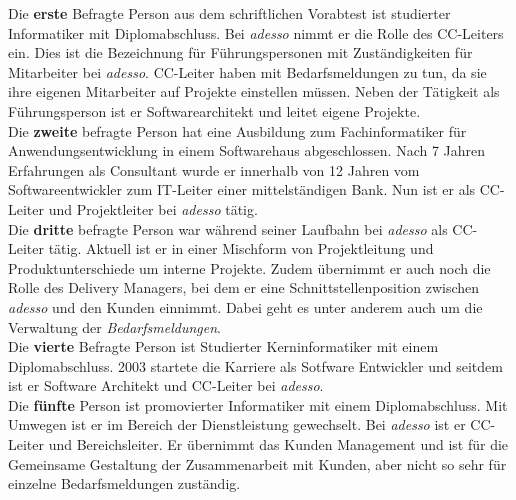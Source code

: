 Die \textbf{erste} Befragte Person aus dem schriftlichen Vorabtest ist studierter Informatiker mit Diplomabschluss. Bei \emph{adesso} nimmt er die Rolle des CC-Leiters ein. Dies ist die Bezeichnung für Führungspersonen mit Zuständigkeiten für Mitarbeiter bei \emph{adesso}. CC-Leiter haben mit Bedarfsmeldungen zu tun, da sie ihre eigenen Mitarbeiter auf Projekte einstellen müssen. Neben der Tätigkeit als Führungsperson ist er Softwarearchitekt und leitet eigene Projekte.\\
Die \textbf{zweite} befragte Person hat eine Ausbildung zum Fachinformatiker für Anwendungsentwicklung in einem Softwarehaus abgeschlossen. Nach 7 Jahren Erfahrungen als Consultant wurde er innerhalb von 12 Jahren vom Softwareentwickler zum IT-Leiter einer mittelständigen Bank. Nun ist er als CC-Leiter und Projektleiter bei \emph{adesso} tätig.\\
Die \textbf{dritte} befragte Person war während seiner Laufbahn bei \emph{adesso} als CC-Leiter tätig. Aktuell ist er in einer Mischform von Projektleitung und Produktunterschiede um interne Projekte. Zudem übernimmt er auch noch die Rolle des Delivery Managers, bei dem er eine Schnittstellenposition zwischen \emph{adesso} und den Kunden einnimmt. Dabei geht es unter anderem auch um die Verwaltung der \emph{Bedarfsmeldungen}.\\
Die \textbf{vierte} Befragte Person ist Studierter Kerninformatiker mit einem Diplomabschluss. 2003 startete die Karriere als Sotfware Entwickler und seitdem ist er Software Architekt und CC-Leiter bei \emph{adesso}.\\
Die \textbf{fünfte} Person ist promovierter Informatiker mit einem Diplomabschluss. Mit Umwegen ist er im Bereich der Dienstleistung gewechselt. Bei \emph{adesso} ist er CC-Leiter und Bereichsleiter. Er übernimmt das Kunden Management und ist für die Gemeinsame Gestaltung der Zusammenarbeit mit Kunden, aber nicht so sehr für einzelne Bedarfsmeldungen zuständig.






